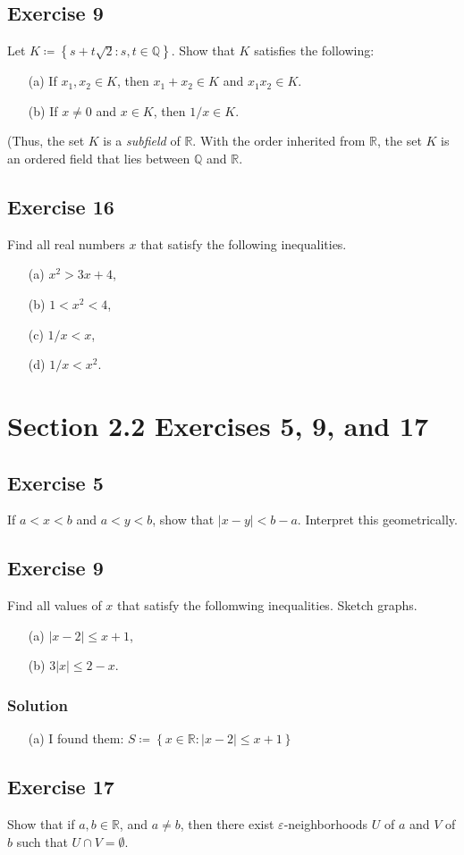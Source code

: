 \documentclass[12pt]{article}
\begin{document}
\subsection*{Exercise 9}
Let $K \coloneqq \left\{s + t\sqrt{2} : s, t \in \mathbb{Q}\right\}$. Show that $K$ satisfies the following:
\begin{itemize}
\item[(a)] If $x_1, x_2 \in K$, then $x_1 + x_2 \in K$ and $x_1x_2 \in K$.
\item[(b)] If $x \neq 0$ and $x \in K$, then $1/x \in K$.
\end{itemize}
(Thus, the set $K$ is a {\it subfield} of $\mathbb{R}$. With the order inherited from $\mathbb{R}$, the set $K$ is an ordered field that lies between $\mathbb{Q}$ and $\mathbb{R}$.

\subsection*{Exercise 16}
Find all real numbers $x$ that satisfy the following inequalities.
\begin{itemize}
\item[(a)] $x^2 > 3x + 4$,
\item[(b)] $1 < x^2 < 4$,
\item[(c)] $1/x < x$,
\item[(d)] $1/x < x^2$.
\end{itemize}

\section*{Section 2.2 Exercises 5, 9, and 17}
\subsection*{Exercise 5}
If $a < x < b$ and $a < y < b$, show that $\left|x - y\right| < b - a$. Interpret this geometrically.

\subsection*{Exercise 9}
Find all values of $x$ that satisfy the follomwing inequalities. Sketch graphs.
\begin{itemize}
\item[(a)] $\left| x - 2\right| \leq x + 1$,
\item[(b)] $3\left|x\right| \leq 2 - x$.
\end{itemize}
\subsubsection*{Solution}
\begin{itemize}
\item[(a)] I found them: $S \coloneqq \left\{x \in \mathbb{R} : \left|x - 2\right| \leq x + 1\right\}$
\end{itemize}

\subsection*{Exercise 17}
Show that if $a, b \in \mathbb{R}$, and $a \neq b$, then there exist $\varepsilon$-neighborhoods $U$ of $a$ and $V$ of $b$ such that $U \cap V = \emptyset$.
\end{document}
